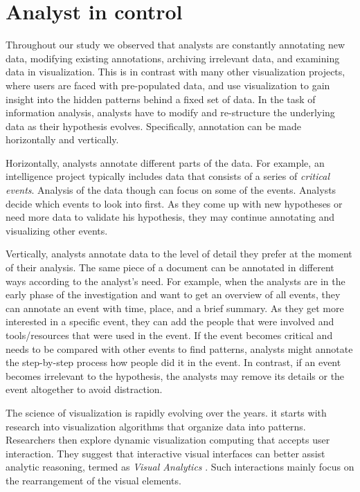 \section{Analyst in control}

Throughout our study we observed that analysts are constantly annotating new data, modifying existing annotations, archiving irrelevant data, and examining data in visualization. This is in contrast with many other visualization projects, where users are faced with pre-populated data, and use visualization to gain insight into the hidden patterns behind a fixed set of data. In the task of information analysis, analysts have to modify and re-structure the underlying data as their hypothesis evolves. Specifically, annotation can be made horizontally and vertically.

Horizontally, analysts annotate different parts of the data. For example, an intelligence project typically includes data that consists of a series of \textit{critical events}. Analysis of the data though can focus on some of the events. Analysts decide which events to look into first. As they come up with new hypotheses or need more data to validate his hypothesis, they may continue annotating and visualizing other events.

Vertically, analysts annotate data to the level of detail they prefer at the moment of their analysis. The same piece of a document can be annotated in different ways according to the analyst's need. For example, when the analysts are in the early phase of the investigation and want to get an overview of all events, they can annotate an event with time, place, and a brief summary. As they get more interested in a specific event, they can add the people that were involved and tools/resources that were used in the event. If the event becomes critical and needs to be compared with other events to find patterns, analysts might annotate the step-by-step process how people did it in the event. In contrast, if an event becomes irrelevant to the hypothesis, the analysts may remove its details or the event altogether to avoid distraction. 

The science of visualization is rapidly evolving over the years. it starts with research into visualization algorithms that organize data into patterns. Researchers then explore dynamic visualization computing that accepts user interaction. They suggest that interactive visual interfaces can better assist analytic reasoning, termed as \emph{Visual Analytics} \citep{thomas2005illuminating}. Such interactions mainly focus on the rearrangement of the visual elements. 

